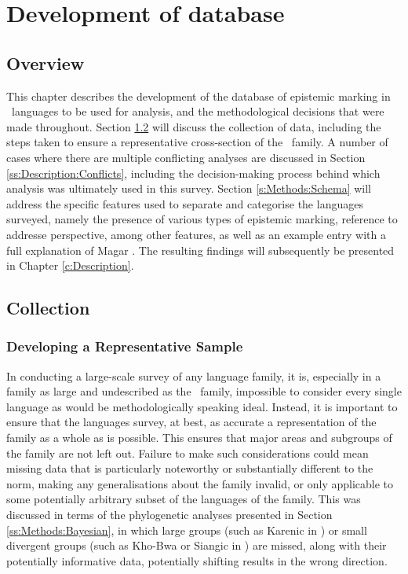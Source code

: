 \chapter{Development of database}\label{c:Methods}
\section{Overview}
This chapter describes the development of the database of epistemic marking in \lfam\ languages to be used for analysis, and the methodological decisions that were made throughout. Section \ref{s:Methods:Collection} will discuss the collection of data, including the steps taken to ensure a representative cross-section of the \lfam\ family. A number of cases where there are multiple conflicting analyses are discussed in Section \ref{ss:Description:Conflicts}, including the decision-making process behind which analysis was ultimately used in this survey. Section \ref{s:Methods:Schema} will address the specific features used to separate and categorise the languages surveyed, namely the presence of various types of epistemic marking, reference to addresse perspective, among other features, as well as an example entry with a full explanation of Magar \cite[Magaric: Nepal][]{GrunowHarsta2008}. The resulting findings will subsequently be presented in Chapter \ref{c:Description}.

\section{Collection}\label{s:Methods:Collection}
\subsection{Developing a Representative Sample}\label{ss:Methods:RepSample}
In conducting a large-scale survey of any language family, it is, especially in a family as large and undescribed as the \lfam\ family, impossible to consider every single language as would be methodologically speaking ideal. Instead, it is important to ensure that the languages survey, at best, as accurate a representation of the family as a whole as is possible. This ensures that major areas and subgroups of the family are not left out. Failure to make such considerations could mean missing data that is particularly noteworthy or substantially different to the norm, making any generalisations about the family invalid, or only applicable to some potentially arbitrary subset of the languages of the family. This was discussed in terms of the phylogenetic analyses presented in Section \ref{ss:Methods:Bayesian}, in which large groups (such as Karenic in ) or small divergent groups (such as Kho-Bwa or Siangic in ) are missed, along with their potentially informative data, potentially shifting results in the wrong direction.

